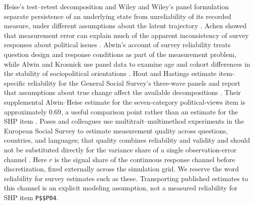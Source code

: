 Heise's test--retest decomposition and Wiley and Wiley's panel formulation separate persistence of an underlying state from unreliability of its recorded measure, under different assumptions about the latent trajectory \cite{heise1969,wiley1970}.
Achen showed that measurement error can explain much of the apparent inconsistency of survey responses about political issues \cite{achen1975}.
Alwin's account of survey reliability treats question design and response conditions as part of the measurement problem, while Alwin and Krosnick use panel data to examine age and cohort differences in the stability of sociopolitical orientations \cite{alwin2007,alwinkrosnick1991}.
Hout and Hastings estimate item-specific reliability for the General Social Survey's three-wave panels and report that assumptions about true change affect the available decompositions \cite{hout2016}.
Their supplemental Alwin--Heise estimate for the seven-category political-views item is approximately $0.69$, a useful comparison point rather than an estimate for the SHP item \cite{hout2016}.
Poses and colleagues use multitrait--multimethod experiments in the European Social Survey to estimate measurement quality across questions, countries, and languages; that quality combines reliability and validity and should not be substituted directly for the variance share of a single observation-error channel \cite{poses2021}.
Here $r$ is the signal share of the continuous response channel before discretization, fixed externally across the simulation grid. We reserve the word reliability for survey estimates such as these. Transporting published estimates to this channel is an explicit modeling assumption, not a measured reliability for SHP item \texttt{P\$\$P04}.
